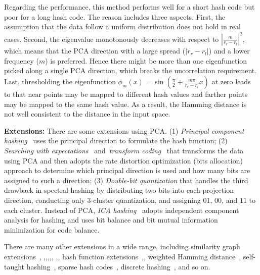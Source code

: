 \documentclass[10pt,journal,compsoc]{IEEEtran}
\begin{document}
Regarding the performance,
this method performs
well for a short hash code
but poor for a long hash code.
The reason includes three aspects.
First,
the assumption
that
the data follow a uniform distribution
does not hold in real cases.
Second,
the eigenvalue monotonously decreases
with respect to $|\frac{m}{r_r - r_l}|^2$,
which means that
the PCA direction with a large spread ($|r_r - r_l|$)
and a lower frequency ($m$) is preferred.
Hence there might be more than one eigenfunction picked along a single PCA direction,
which breaks the uncorrelation requirement.
Last,
thresholding the eigenfunction
$\phi_m(x) = \sin(\frac{\pi}{2} + \frac{m\pi}{r_r - r_l}x)$
at zero
leads to
that near points may be mapped to different hash values
and farther points may be mapped to the same hash value.
As a result,
the Hamming distance is not well consistent to the distance in the input space.

\textbf{Extensions:}
There are some extensions using PCA.
(1) \emph{Principal component hashing}~\cite{MatsushitaW09}
uses the principal direction
to formulate the hash function;
(2) \emph{Searching with expectations}~\cite{SandhawaliaJ10}
and~\emph{transform coding}~\cite{Brandt10}
that transforms the data using PCA
and then adopts
the rate distortion optimization (bits allocation) approach
to determine which principal direction is used
and how many bits are assigned to such a direction;
(3) \emph{Double-bit quantization}
that handles the third drawback in spectral hashing
by distributing two bits into each projection direction,
conducting only $3$-cluster quantization,
and assigning $01$, $00$, and $11$
to each cluster.
Instead of PCA, \emph{ICA hashing}~\cite{HeCRB11}
adopts independent component analysis for hashing
and uses bit balance and bit mutual information minimization
for code balance.

There are many other extensions
in a wide range,
including similarity graph extensions~\cite{LiWCXL13},
\cite{ZhuangLWZS11},\cite{LiuSXWZ13},\cite{LiuWKC11},\cite{LiuMKC14},\cite{LinJCYL13},
\cite{ShiXCZXY16},\cite{ZhangLGZ16},
hash function extensions~\cite{HeLC10},\cite{ShaoWOZ12},
weighted Hamming distance~\cite{WangZS13},
self-taught hashing~\cite{ZhangWCL10b},
sparse hash codes~\cite{ZhuHCCS13},
discrete hashing~\cite{YangSSLL15},
and so on.
\end{document}
